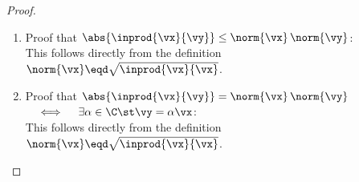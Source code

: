 \begin{proof}
\begin{enumerate}
\begin{enumerate}
    \item The above equation is in the quadratic form used in the lemma of part (a).
      \begin{align*}
        \left(\mcom{2 \abs{\inprod{\vx}{\vy}} }{$b$}\right)^2
          &\le 4\mcom{\inprod{\vy}{\vy}}{$a$}\; \mcom{\inprod{\vx}{\vx}}{$c$}
          &&   \text{by the results of parts (a) and (b)}
          \\\implies
          \abs{\inprod{\vx}{\vy}}^2 \le \inprod{\vx}{\vx}\, \inprod{\vy}{\vy}
      \end{align*}
  \end{enumerate}

  \item Proof that $\abs{\inprod{\vx}{\vy}} \le \norm{\vx}\,\norm{\vy}$:\\
        This follows directly from the definition $\norm{\vx}\eqd\sqrt{\inprod{\vx}{\vx}}$.

  \item Proof that $\abs{\inprod{\vx}{\vy}} = \norm{\vx}\,\norm{\vy}$ $\quad\iff\quad \exists \alpha\in\C \st \vy=\alpha\vx$:\\
        This follows directly from the definition $\norm{\vx}\eqd\sqrt{\inprod{\vx}{\vx}}$.
\end{enumerate}
\end{proof}

